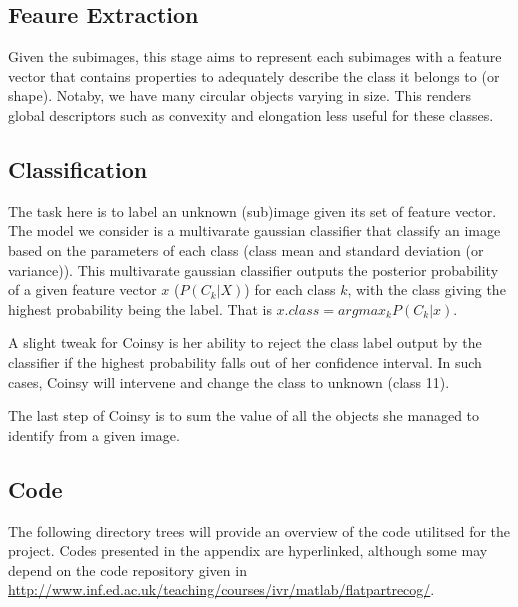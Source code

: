 \documentclass[main.tex]{subfiles}
\begin{document}
\subsection*{Feaure Extraction}
Given the subimages, this stage aims to represent each subimages with a feature vector that contains properties to adequately describe the class it belongs to (or shape). Notaby, we have many circular objects varying in size. This renders global descriptors such as convexity and elongation less useful for these classes.

\subsection*{Classification}
The task here is to label an unknown (sub)image given its set of feature vector. The model we consider is a multivarate gaussian classifier that classify an image based on the parameters of each class (class mean and standard deviation (or variance)). This multivarate gaussian classifier outputs the posterior probability of a given feature vector $x$ ($P(C_{k}|X)$) for each class $k$, with the class giving the highest probability being the label. That is $x.class = argmax_{k} P(C_{k}|x)$.

A slight tweak for Coinsy is her ability to reject the class label output by the classifier if the highest probability falls out of her confidence interval. In such cases, Coinsy will intervene and change the class to unknown (class 11).

The last step of Coinsy is to sum the value of all the objects she managed to identify from a given image.

\subsection*{Code}
The following directory trees will provide an overview of the code utilitsed for the project. Codes presented in the appendix are hyperlinked, although some may depend on the code repository given in \url{http://www.inf.ed.ac.uk/teaching/courses/ivr/matlab/flatpartrecog/}.
\end{document}

